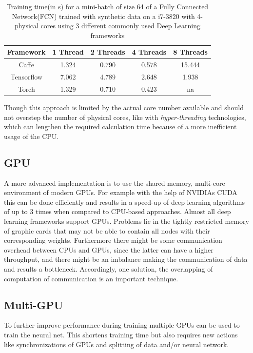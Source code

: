 \documentclass[conference]{IEEEtran}
\begin{document}
\begin{table} 
\centering
\begin{tabular}{c c c c c}
\hline
Framework & 1 Thread & 2 Threads &4 Threads & 8 Threads\\\hline
Caffe & 1.324 & 0.790 & 0.578 & 15.444 \\
Tensorflow & 7.062 & 4.789 & 2.648 & 1.938 \\
Torch & 1.329 & 0.710 & 0.423 & na \\\hline
\end{tabular}
\caption{Training time(in s) for a mini-batch of size 64 of a Fully Connected Network(FCN) trained with synthetic data on a i7-3820 with 4-physical cores using 3 different commonly used Deep Learning frameworks\cite{shi2016benchmarking}}
\label{fig_ttfcn}
\end{table}

Though this approach is limited by the actual core number available and should not overstep the number of physical cores, like with \emph{hyper-threading} technologies, which can lengthen the required calculation time because of a more inefficient usage of the CPU\cite{shi2016benchmarking}.


\subsection{GPU}
A more advanced implementation is to use the shared memory, multi-core environment of modern GPUs. For example with the help of  NVIDIAs CUDA this can be done efficiently and results in a speed-up of deep learning algorithms of up to 3 times when compared to CPU-based approaches. Almost all deep learning frameworks support GPUs. 
Problems lie in the tightly restricted memory of graphic cards that may not be able to contain all nodes with their corresponding weights.  Furthermore there might be some communication overhead between CPUs and GPUs, since the latter can have a higher throughput, and there might be an imbalance making the communication of data and results a bottleneck. Accordingly, one solution, the overlapping of computation of communication is an important technique.


\subsection{Multi-GPU}
To further improve performance during training multiple GPUs can be used to train the neural net. This shortens training time but also requires new actions like synchronizations of GPUs and splitting of data and/or neural network.
\end{document}
